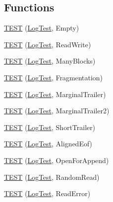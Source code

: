 \subsection*{Functions}
\begin{DoxyCompactItemize}
\item 
\mbox{\hyperlink{namespaceleveldb_1_1log_ab8a02b9419477420eca51cfd47d5f172}{T\+E\+ST}} (\mbox{\hyperlink{classleveldb_1_1log_1_1_log_test}{Log\+Test}}, Empty)
\item 
\mbox{\hyperlink{namespaceleveldb_1_1log_aabca07adceffd87baf38b81665d92bb4}{T\+E\+ST}} (\mbox{\hyperlink{classleveldb_1_1log_1_1_log_test}{Log\+Test}}, Read\+Write)
\item 
\mbox{\hyperlink{namespaceleveldb_1_1log_a60249ea325a8656fdc31898d7c5f4ad9}{T\+E\+ST}} (\mbox{\hyperlink{classleveldb_1_1log_1_1_log_test}{Log\+Test}}, Many\+Blocks)
\item 
\mbox{\hyperlink{namespaceleveldb_1_1log_ac15e5779ff43d83522727b8cc44882a2}{T\+E\+ST}} (\mbox{\hyperlink{classleveldb_1_1log_1_1_log_test}{Log\+Test}}, Fragmentation)
\item 
\mbox{\hyperlink{namespaceleveldb_1_1log_a9721de928c01ac50b5770b8b4cbb98e1}{T\+E\+ST}} (\mbox{\hyperlink{classleveldb_1_1log_1_1_log_test}{Log\+Test}}, Marginal\+Trailer)
\item 
\mbox{\hyperlink{namespaceleveldb_1_1log_aad9c4a11c674359115f4d16c97e33ad1}{T\+E\+ST}} (\mbox{\hyperlink{classleveldb_1_1log_1_1_log_test}{Log\+Test}}, Marginal\+Trailer2)
\item 
\mbox{\hyperlink{namespaceleveldb_1_1log_a1a1972ff9493353cfb4546cacd33ddb7}{T\+E\+ST}} (\mbox{\hyperlink{classleveldb_1_1log_1_1_log_test}{Log\+Test}}, Short\+Trailer)
\item 
\mbox{\hyperlink{namespaceleveldb_1_1log_a55d554f8c576d9d4d99e35d3fe0c169f}{T\+E\+ST}} (\mbox{\hyperlink{classleveldb_1_1log_1_1_log_test}{Log\+Test}}, Aligned\+Eof)
\item 
\mbox{\hyperlink{namespaceleveldb_1_1log_a078c001c07b1e30d68d374b0fdb0f55c}{T\+E\+ST}} (\mbox{\hyperlink{classleveldb_1_1log_1_1_log_test}{Log\+Test}}, Open\+For\+Append)
\item 
\mbox{\hyperlink{namespaceleveldb_1_1log_a52d33034be964c0d0e40efdf4b423452}{T\+E\+ST}} (\mbox{\hyperlink{classleveldb_1_1log_1_1_log_test}{Log\+Test}}, Random\+Read)
\item 
\mbox{\hyperlink{namespaceleveldb_1_1log_a47ffd653cde9cb9bc00c0a9914da48fd}{T\+E\+ST}} (\mbox{\hyperlink{classleveldb_1_1log_1_1_log_test}{Log\+Test}}, Read\+Error)

\end{DoxyCompactItemize}
